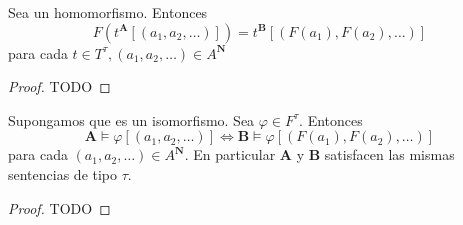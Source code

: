 \begin{lemma}
  Sea  un homomorfismo. Entonces
  $$
  F(t^\mathbf{A}[(a_1, a_2, \dots)]) = t^\mathbf{B}[(F(a_1), F(a_2), \dots)]
  $$
  para cada $t \in T^\tau, (a_1, a_2, \dots) \in A^\mathbf{N}$
\end{lemma}

\begin{proof}
  TODO
\end{proof}

\begin{lemma}
  Supongamos que  es un isomorfismo. Sea $\varphi \in F^\tau$. Entonces
  $$
  \mathbf{A}\models\varphi[(a_1, a_2, \dots)] \iff \mathbf{B}\models\varphi[(F(a_1), F(a_2),\dots)]
  $$
  para cada $(a_1, a_2, \dots) \in A^\mathbf{N}$. En particular $\mathbf{A}$ y $\mathbf{B}$ satisfacen las mismas
  sentencias de tipo $\tau$.
\end{lemma}
\begin{proof}
  TODO
\end{proof}
